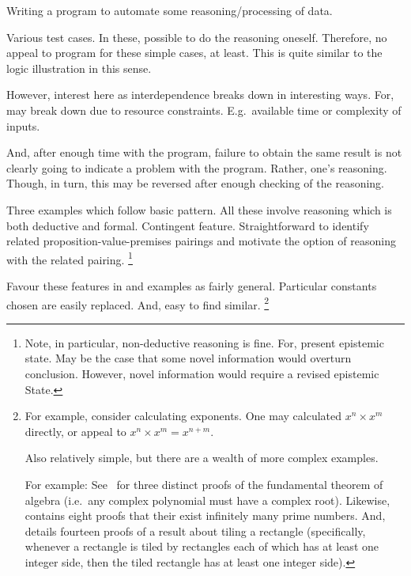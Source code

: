 \begin{note}[Programming]
  \begin{scenario}
    \label{illu:programming}
    Writing a program to automate some reasoning/processing of data.
  \end{scenario}
  Various test cases.
  In these, possible to do the reasoning oneself.
  Therefore, no appeal to program for these simple cases, at least.
  This is quite similar to the logic illustration in this sense.

  However, interest here as interdependence breaks down in interesting ways.
  For, may break down due to resource constraints.
  E.g.\ available time or complexity of inputs.

  And, after enough time with the program, failure to obtain the same result is not clearly going to indicate a problem with the program.
  Rather, one's reasoning.
  Though, in turn, this may be reversed after enough checking of the reasoning.
\end{note}

\begin{note}
  Three examples which follow basic pattern.
  All these involve reasoning which is both deductive and formal.
  Contingent feature.
  Straightforward to identify related proposition-value-premises pairings and motivate the option of reasoning with the related pairing.%
  \footnote{
    Note, in particular, non-deductive reasoning is fine.
    For, present epistemic state.
    May be the case that some novel information would overturn conclusion.
    However, novel information would require a revised epistemic State.
  }

  Favour these features in  and examples as fairly general.
  Particular constants chosen are easily replaced.
  And, easy to find similar.%
  \footnote{
    For example, consider calculating exponents.
    One may calculated \(x^{n} \times x^{m}\) directly, or appeal to \(x^{n} \times x^{m} = x^{n + m}\).
 
    Also relatively simple, but there are a wealth of more complex examples.

    For example:
    See~\textcite{Fine:1997vc} for three distinct proofs of the fundamental theorem of algebra (i.e.\ any complex polynomial must have a complex root).
    Likewise, \textcite{Ribenboim:2012ts} contains eight proofs that their exist infinitely many prime numbers.
    And, \textcite{Wagon:1987vm} details fourteen proofs of a result about tiling a rectangle (specifically, whenever a rectangle is tiled by rectangles each of which has at least one integer side, then the tiled rectangle has at least one integer side).
  }
\end{note}

